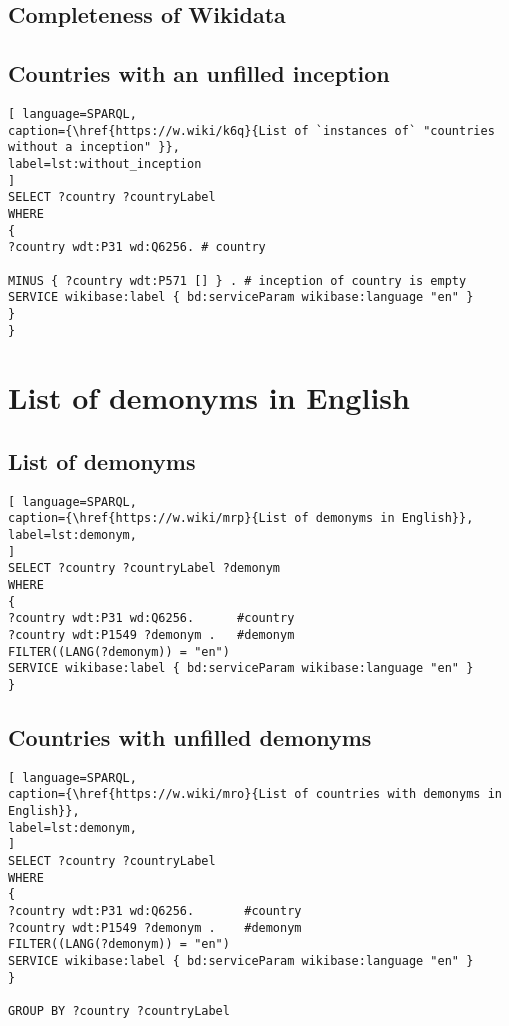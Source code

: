 \subsection{Completeness of Wikidata}

\subsection{Countries with an unfilled inception}

\begin{lstlisting}[ language=SPARQL, 
caption={\href{https://w.wiki/k6q}{List of `instances of` "countries without a inception" }},
label=lst:without_inception
]
SELECT ?country ?countryLabel 
WHERE
{
?country wdt:P31 wd:Q6256. # country

MINUS { ?country wdt:P571 [] } . # inception of country is empty
SERVICE wikibase:label { bd:serviceParam wikibase:language "en" }
}
}
\end{lstlisting}

\section{List of demonyms in English}

\subsection{List of demonyms}

\begin{lstlisting}[ language=SPARQL, 
caption={\href{https://w.wiki/mrp}{List of demonyms in English}},
label=lst:demonym, 
]
SELECT ?country ?countryLabel ?demonym
WHERE
{
?country wdt:P31 wd:Q6256.      #country
?country wdt:P1549 ?demonym .   #demonym
FILTER((LANG(?demonym)) = "en")
SERVICE wikibase:label { bd:serviceParam wikibase:language "en" }
}
\end{lstlisting}

\subsection{Countries with unfilled demonyms}

\begin{lstlisting}[ language=SPARQL, 
caption={\href{https://w.wiki/mro}{List of countries with demonyms in English}},
label=lst:demonym, 
]
SELECT ?country ?countryLabel 
WHERE
{
?country wdt:P31 wd:Q6256.       #country
?country wdt:P1549 ?demonym .    #demonym
FILTER((LANG(?demonym)) = "en")
SERVICE wikibase:label { bd:serviceParam wikibase:language "en" }
}

GROUP BY ?country ?countryLabel
\end{lstlisting}

